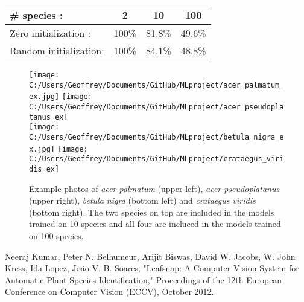 \documentclass[12pt]{article}
\begin{document}
\begin{center}
\begin{tabular}{|l|c|c|c|}
 \hline
 \# species : & 2 & 10 & 100\\
 \hline
 Zero initialization : & 100\% & 81.8\% & 49.6\%\\
 Random initialization: & 100\% & 84.1\% & 48.8\%\\
 \hline
\end{tabular}
\end{center}

\begin{figure}
\texttt{[image: C:/Users/Geoffrey/Documents/GitHub/MLproject/acer\_palmatum\_ex.jpg]} \texttt{[image: C:/Users/Geoffrey/Documents/GitHub/MLproject/acer\_pseudoplatanus\_ex]} \\ \texttt{[image: C:/Users/Geoffrey/Documents/GitHub/MLproject/betula\_nigra\_ex.jpg]} \texttt{[image: C:/Users/Geoffrey/Documents/GitHub/MLproject/crataegus\_viridis\_ex]}
\caption{\label{fig:exphotosmulti} Example photos of \textit{acer palmatum} (upper left), \textit{acer pseudoplatanus} (upper right), \textit{betula nigra} (bottom left) and \textit{crataegus viridis} (bottom right). The two species on top are included in the models trained on 10 species and all four are incluced in the models trained on 100 species.}
\end{figure}

\begin{thebibliography}{99}
 Neeraj Kumar, Peter N. Belhumeur, Arijit Biswas, David W. Jacobs, W. John Kress, Ida Lopez, Jo\~{a}o V. B. Soares, "Leafsnap: A Computer Vision System for Automatic Plant Species Identification," Proceedings of the 12th European Conference on Computer Vision (ECCV), October 2012.
\end{thebibliography}
\end{document}
